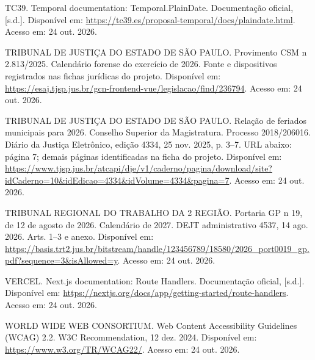 \begin{singlespace}
\label{ref:TEMPORAL}TC39. Temporal documentation: Temporal.PlainDate. Documentação oficial, [s.d.]. Disponível em: \url{https://tc39.es/proposal-temporal/docs/plaindate.html}. Acesso em: 24 out. 2026.\par
{}\label{ref:TJSP2813}TRIBUNAL DE JUSTIÇA DO ESTADO DE SÃO PAULO. Provimento CSM n\textordmasculine{} 2.813/2025. Calendário forense do exercício de 2026. Fonte e dispositivos registrados nas fichas jurídicas do projeto. Disponível em: \url{https://esaj.tjsp.jus.br/gcn-frontend-vue/legislacao/find/236794}. Acesso em: 24 out. 2026.\par
{}\label{ref:TJSPMUN}TRIBUNAL DE JUSTIÇA DO ESTADO DE SÃO PAULO. Relação de feriados municipais para 2026. Conselho Superior da Magistratura. Processo 2018/206016. Diário da Justiça Eletrônico, edição 4334, 25 nov. 2025, p. 3--7. URL abaixo: página 7; demais páginas identificadas na ficha do projeto. Disponível em: \url{https://www.tjsp.jus.br/atcapi/dje/v1/caderno/pagina/download/site?idCaderno=10&idEdicao=4334&idVolume=4334&pagina=7}. Acesso em: 24 out. 2026.\par
{}\label{ref:TRT2027}TRIBUNAL REGIONAL DO TRABALHO DA 2\textordfeminine{} REGIÃO. Portaria GP n\textordmasculine{} 19, de 12 de agosto de 2026. Calendário de 2027. DEJT administrativo 4537, 14 ago. 2026. Arts. 1\textordmasculine{}--3\textordmasculine{} e anexo. Disponível em: \url{https://basis.trt2.jus.br/bitstream/handle/123456789/18580/2026_port0019_gp.pdf?sequence=3&isAllowed=y}. Acesso em: 24 out. 2026.\par
{}\label{ref:NEXT}VERCEL. Next.js documentation: Route Handlers. Documentação oficial, [s.d.]. Disponível em: \url{https://nextjs.org/docs/app/getting-started/route-handlers}. Acesso em: 24 out. 2026.\par
{}\label{ref:WCAG}WORLD WIDE WEB CONSORTIUM. Web Content Accessibility Guidelines (WCAG) 2.2. W3C Recommendation, 12 dez. 2024. Disponível em: \url{https://www.w3.org/TR/WCAG22/}. Acesso em: 24 out. 2026.\par
\end{singlespace}